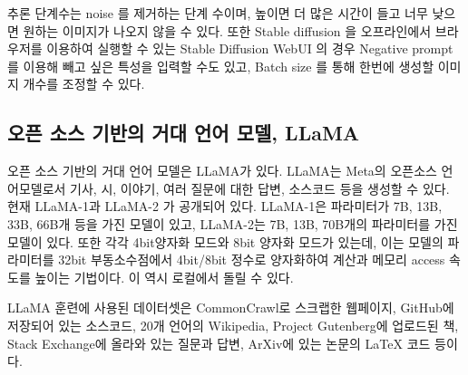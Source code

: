 추론 단계수는 noise 를 제거하는 단계 수이며, 높이면 더 많은 시간이 들고 너무 낮으면
원하는 이미지가 나오지 않을 수 있다. 또한 Stable diffusion 을 오프라인에서 브라우저를
이용하여 실행할 수 있는 Stable Diffusion WebUI 의 경우 Negative prompt 를 이용해 빼고
싶은 특성을 입력할 수도 있고, Batch size 를 통해 한번에 생성할 이미지 개수를 조정할 수
있다.
\subsection{오픈 소스 기반의 거대 언어 모델, LLaMA}
오픈 소스 기반의 거대 언어 모델은 LLaMA가 있다. LLaMA는 Meta의 오픈소스 언어모델로서 기사, 시, 이야기, 여러 질문에 대한 답변, 소스코드 등을 생성할 수 있다. 현재 LLaMA-1\cite{touvron2023llama}과 LLaMA-2\cite{touvron2023llama2} 가 공개되어 있다. LLaMA-1은 파라미터가 7B, 13B, 33B, 66B개 등을 가진 모델이 있고, LLaMA-2는 7B, 13B, 70B개의 파라미터를 가진 모델이 있다. 또한 각각 4bit양자화 모드와 8bit 양자화 모드가 있는데, 이는 모델의 파라미터를 32bit 부동소수점에서 4bit/8bit 정수로 양자화하여 계산과 메모리 access 속도를 높이는 기법이다. 이 역시 로컬에서 돌릴 수 있다\cite{raghuraman2020introduction}.

LLaMA 훈련에 사용된 데이터셋은 CommonCrawl로 스크랩한 웹페이지, GitHub에 저장되어 있는 소스코드, 20개 언어의 Wikipedia, Project Gutenberg에 업로드된 책, Stack Exchange에 올라와 있는 질문과 답변, ArXiv에 있는 논문의 LaTeX 코드 등이다.
